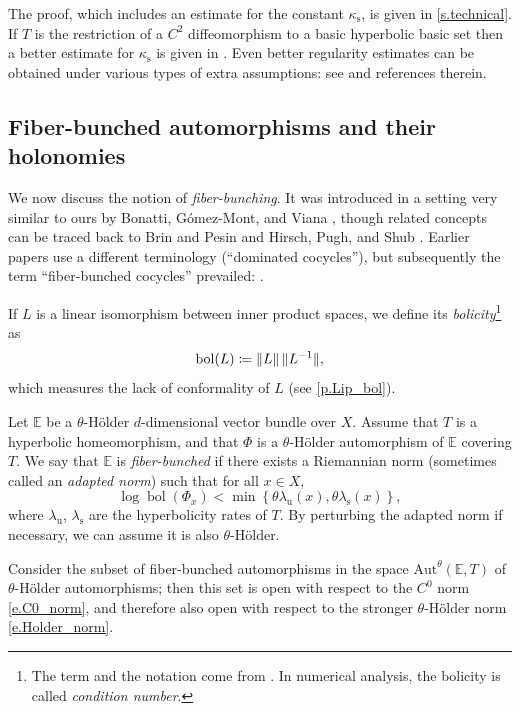 \documentclass[JEP,XML,SOM,Unicode]{cedram}
\def\vcentcolon{\mathrel{\mathop\ordinarycolon}}
\providecommand\ordinarycolon{:}
\providecommand*\coloneqq{\vcentcolon\mathrel{\mkern-1.2mu}=}
\theoremstyle{plain}
\theoremstyle{definition}
\newcommand{\EE}{\mathbb{E}}
\newcommand{\uu}{\mathrm{u}}
\renewcommand{\ss}{\mathrm{s}}
\newcommand{\Aut}{\mathrm{Aut}}
\DeclareMathOperator{\bol}{bol}
\begin{document}
The proof, which includes an estimate for the constant $\kappa_\ss$, is given in \cref{s.technical}.
If $T$ is the restriction of a $C^2$ diffeomorphism to a basic hyperbolic basic set then a better estimate for $\kappa_\ss$ is given in \cite{SS}. Even better regularity estimates can be obtained under various types of extra assumptions: see \cite{PintoRand} and references therein.

\subsection{Fiber-bunched automorphisms and their holonomies}

We now discuss the notion of \emph{fiber-bunching}.
It was introduced in a setting very similar to ours by \hbox{Bonatti}, Gómez-Mont, and Viana \cite{BGV}, though related concepts can be traced back to Brin and Pesin \cite{BrinP} and Hirsch, Pugh, and Shub \cite{HPS}.
Earlier papers \cite{BGV,BV} use a different terminology (``dominated cocycles''), but subsequently the term ``fiber-bunched cocycles'' prevailed: \cite{AV_Portugalia,AV_Inventiones,KalSad}.

If $L$ is a linear isomorphism between inner product spaces, we define its \emph{bolicity}\footnote{The term and the notation come from \cite{Pugh,PSW1}. In numerical analysis, the bolicity is called \emph{condition number}.} as
\begin{equation} \label{e.def_bol}
\bol(L) \coloneqq \|L\| \, \|L^{-1}\|,
\end{equation}
which measures the lack of conformality of $L$ (see \cref{p.Lip_bol}).

Let $\EE$ be a $\theta$-Hölder $d$-dimensional vector bundle over $X$.
Assume that $T$ is a hyperbolic homeomorphism, and that $\Phi$ is a $\theta$-Hölder automorphism of $\EE$ covering $T$.
We say that $\EE$ is \emph{fiber-bunched}
if there exists a Riemannian norm (sometimes called an \emph{adapted norm})
such that for all $x \in X$,
\begin{equation}\label{e.def_fiber_bunched}
\log \bol(\Phi_x)
< \min \left\{ \theta \lambda_\uu(x), \theta \lambda_\ss(x)\right\},
\end{equation}
where $\lambda_\uu$, $\lambda_\ss$ are the hyperbolicity rates of $T$.
By perturbing the adapted norm if necessary, we can assume it is also $\theta$-Hölder.

Consider the subset of fiber-bunched automorphisms in the space $\Aut^\theta(\EE,T)$ of $\theta$-Hölder automorphisms; then this set is open with respect to the $C^0$ norm \eqref{e.C0_norm}, and therefore also open with respect to the stronger $\theta$-Hölder norm \eqref{e.Holder_norm}.
\end{document}
